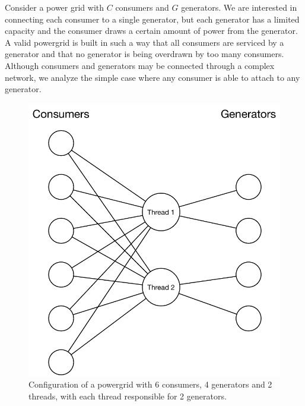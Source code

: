 Consider a power grid with $C$ consumers and $G$ generators. We are interested
in connecting each consumer to a single generator, but each generator has a
limited capacity and the consumer draws a certain amount of power from the
generator. A valid powergrid is built in such a way that all consumers are
serviced by a generator and that no generator is being overdrawn by too many
consumers. Although consumers and generators may be connected through a complex
network, we analyze the simple case where any consumer is able to attach to any
generator.

\begin{figure}
   \begin{center}
      \includegraphics[width=1\linewidth]{figures/threads/powergrid.pdf}
   \end{center}
   \caption{Configuration of a powergrid with 6 consumers, 4
      generators and 2 threads, with each thread responsible for 2 generators.}
   \label{fig:threads:powergrid}
\end{figure}

